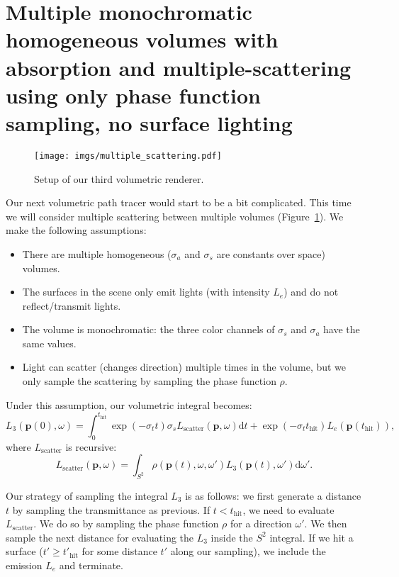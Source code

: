 \section{Multiple monochromatic homogeneous volumes with absorption and multiple-scattering using only phase function sampling, no surface lighting}
\begin{figure}
\texttt{[image: imgs/multiple\_scattering.pdf]}
\caption{Setup of our third volumetric renderer.}
\label{fig:volpath3_illustration}
\end{figure}
Our next volumetric path tracer would start to be a bit complicated. This time we will consider multiple scattering between multiple volumes (Figure~\ref{fig:volpath3_illustration}). We make the following assumptions:
\begin{itemize}
    \item There are multiple homogeneous ($\sigma_a$ and $\sigma_s$ are constants over space) volumes.
    \item The surfaces in the scene only emit lights (with intensity $L_e$) and do not reflect/transmit lights.
    \item The volume is monochromatic: the three color channels of $\sigma_s$ and $\sigma_a$ have the same values.
    \item Light can scatter (changes direction) multiple times in the volume, but we only sample the scattering by sampling the phase function $\rho$.
\end{itemize}

Under this assumption, our volumetric integral becomes:
\begin{equation}
L_3(\mathbf{p}(0), \omega) = \int_{0}^{t_{\text{hit}}} \exp\left(-\sigma_t t \right) \sigma_s L_{\text{scatter}}(\mathbf{p}, \omega) \mathrm{d}t + \exp\left(-\sigma_t t_{\text{hit}} \right) L_e(\mathbf{p}(t_{\text{hit}})),
\label{eq:rte_multiple_scattering_integral_form}
\end{equation}
where $L_{\text{scatter}}$ is recursive:
\begin{equation}
L_{\text{scatter}}(\mathbf{p}, \omega) = \int_{S^2} \rho(\mathbf{p}(t), \omega, \omega') L_3(\mathbf{p}(t), \omega') \mathrm{d}\omega'.
\end{equation}

Our strategy of sampling the integral $L_3$ is as follows: we first generate a distance $t$ by sampling the transmittance as previous. If $t < t_{\text{hit}}$, we need to evaluate $L_{\text{scatter}}$. We do so by sampling the phase function $\rho$ for a direction $\omega'$. We then sample the next distance for evaluating the $L_3$ inside the $S^2$ integral. If we hit a surface ($t' \geq t'_{\text{hit}}$ for some distance $t'$ along our sampling), we include the emission $L_e$ and terminate.


